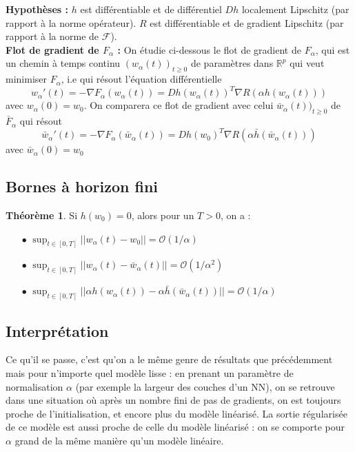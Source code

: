 \documentclass[a4paper, 11pt, french]{article}
\theoremstyle{definition}
\newtheorem{theorem}{Théorème}
\begin{document}
	{\bf Hypothèses : } $h$ est différentiable et de différentiel $Dh$ localement Lipschitz (par rapport à la norme opérateur). $R$ est différentiable et de gradient Lipschitz (par rapport à la norme de $\mathcal{F}$). \\
	
	{\bf Flot de gradient de $F_{\alpha}$ : } On étudie ci-dessous le flot de gradient de $F_{\alpha}$, qui est un chemin à temps continu $(w_{\alpha}(t))_{t\geq 0}$ de paramètres dans $\mathbb{R}^p$ qui veut minimiser $F_{\alpha}$, i.e qui résout l'équation différentielle 
	\[w_{\alpha}'(t) = - \nabla F_{\alpha}(w_{\alpha}(t)) = Dh (w_{\alpha}(t))^T \nabla R (\alpha h(w_{\alpha}(t)))\] avec $w_{\alpha}(0) = w_0$. On comparera ce flot de gradient avec celui $\bar{w}_{\alpha}(t))_{t\geq 0}$ de $\bar{F}_{\alpha}$ qui résout
	\[\bar{w}_{\alpha}'(t) = - \nabla F_{\alpha}(\bar{w}_{\alpha}(t)) = Dh (w_0)^T \nabla R (\alpha \bar{h}(\bar{w}_{\alpha}(t)))\] avec $\bar{w}_{\alpha}(0) = w_0$
	
	\subsection{Bornes à horizon fini}
	
	\begin{theorem}
		Si $h(w_0) = 0$, alors pour un $T > 0$, on a :
		\begin{itemize}
			\item[$\bullet$] $\sup_{t \in [0, T]} ||w_{\alpha}(t) - w_0|| = \mathcal{O}(1 / \alpha)$
			\item[$\bullet$] $\sup_{t \in [0, T]} ||w_{\alpha}(t) - \bar{w}_{\alpha}(t)|| = \mathcal{O}(1 / \alpha^2)$
			\item[$\bullet$] $\sup_{t \in [0, T]} ||\alpha h(w_{\alpha}(t)) - \alpha \bar{h}(\bar{w}_{\alpha}(t))|| = \mathcal{O}(1 / \alpha)$
		\end{itemize}
	\end{theorem}
	
	
	\subsection{Interprétation}
	
	Ce qu'il se passe, c'est qu'on a le même genre de résultats que précédemment mais pour n'importe quel modèle lisse : en prenant un paramètre de normalisation $\alpha$ (par exemple la largeur des couches d'un NN), on se retrouve dans une situation où après un nombre fini de pas de gradients, on est toujours proche de l'initialisation, et encore plus du modèle linéarisé. La sortie régularisée de ce modèle est aussi proche de celle du modèle linéarisé : on se comporte pour $\alpha$ grand de la même manière qu'un modèle linéaire.
	
\end{document}
